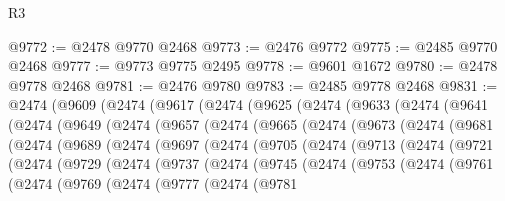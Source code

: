 \begin{lexlean}{R3}
\begin{coremodule}
@9772 := @2478 @9770 @2468
@9773 := @2476 @9772
@9775 := @2485 @9770 @2468
@9777 := @9773 @9775 @2495
@9778 := @9601 @1672
@9780 := @2478 @9778 @2468
@9781 := @2476 @9780
@9783 := @2485 @9778 @2468
@9831 := @2474
    (@9609
      (@2474
        (@9617
          (@2474
            (@9625
              (@2474
                (@9633
                  (@2474
                    (@9641
                      (@2474
                        (@9649
                          (@2474
                            (@9657
                              (@2474
                                (@9665
                                  (@2474
                                    (@9673
                                      (@2474
                                        (@9681
                                          (@2474
                                            (@9689
                                              (@2474
                                                (@9697
                                                  (@2474
                                                    (@9705
                                                      (@2474
                                                        (@9713
                                                          (@2474
                                                            (@9721
                                                              (@2474
                                                                (@9729
                                                                  (@2474
                                                                    (@9737
                                                                      (@2474
                                                                        (@9745
                                                                          (@2474
                                                                            (@9753
                                                                              (@2474
                                                                                (@9761
                                                                                  (@2474
                                                                                    (@9769
                                                                                      (@2474
                                                                                        (@9777
                                                                                          (@2474
                                                                                            (@9781

\end{coremodule}
\end{lexlean}
